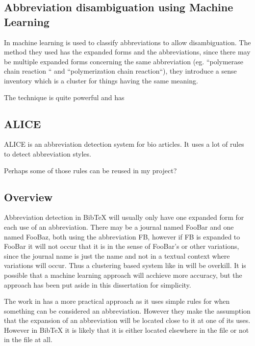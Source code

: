 \subsection{Abbreviation disambiguation using Machine Learning}
In \cite{okazaki2010_building} machine learning is used to classify
abbreviations to allow disambiguation.  The method they used has the
expanded forms and the abbreviations, since there may be multiple
expanded forms concerning the same abbreviation (eg. ``polymerase
chain reaction `` and ``polymerization chain reaction``), they
introduce a sense inventory which is a cluster for things having the
same meaning.

The technique is quite powerful and has

\subsection{ALICE}
ALICE is an abbreviation detection system for bio articles. It uses a
lot of rules to detect abbreviation styles.

Perhaps some of those rules can be reused in my project?

\subsection{Overview}

Abbreviation detection in Bib{\TeX} will usually only have one
expanded form for each use of an abbreviation.  There may be a journal
named FooBar and one named FooBaz, both using the abbreviation FB,
however if FB is expanded to FooBar it will not occur that it is in
the sense of FooBar's or other variations, since the journal name is
just the name and not in a textual context where variations will
occur.  Thus a clustering based system like in
\cite{okazaki2010_building} will be overkill.  It is possible that a
machine learning approach will acchieve more accuracy, but the
approach has been put aside in this dissertation for simplicity.

The work in \cite{?} has a more practical approach as it uses simple
rules for when something can be considered an abbreviation.  However
they make the assumption that the expansion of an abbreviation will be
located close to it at one of its uses.  However in Bib{\TeX} it is
likely that it is either located elsewhere in the file or not in the
file at all.

